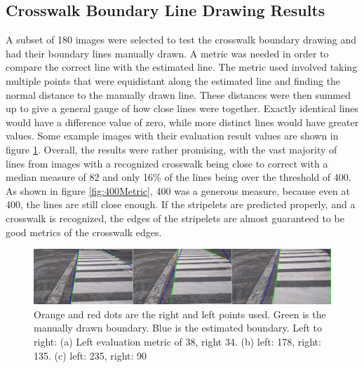 \subsection{Crosswalk Boundary Line Drawing Results}

A subset of 180 images were selected to test the crosswalk boundary drawing and had their boundary lines manually drawn. A metric was needed in order to compare the correct line with the estimated line. The metric used involved taking multiple points that were equidistant along the estimated line and finding the normal distance to the manually drawn line. These distances were then summed up to give a general gauge of how close lines were together. Exactly identical lines would have a difference value of zero, while more distinct lines would have greater values. Some example images with their evaluation result values are shown in figure \ref{fig:LinesUsingJustGoodStartAndEnds2}. Overall, the results were rather promising, with the vast majority of lines from images with a recognized crosswalk being close to correct with a median measure of 82 and only 16\% of the lines being over the threshold of 400. As shown in figure \ref{fig:400Metric}, 400 was a generous measure, because even at 400, the lines are still close enough.  If the stripelets are predicted properly, and a crosswalk is recognized, the edges of the stripelets are almost guaranteed to be good metrics of the crosswalk edges.

\begin{figure}[t]
\begin{center}
\includegraphics[width=15cm]{figures/LinesUsingJustGoodStartAndEnds2.png}
\captionfonts
\caption{Orange and red dots are the right and left points used. Green is the manually drawn boundary. Blue is the estimated boundary. Left to right: (a) Left evaluation metric of 38, right 34. (b) left: 178, right: 135. (c) left: 235, right: 90}
\label{fig:LinesUsingJustGoodStartAndEnds2}
\end{center}
\end{figure}

